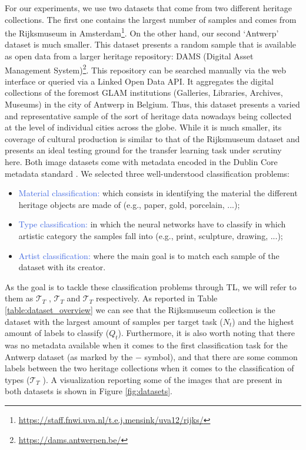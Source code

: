 For our experiments, we use two datasets that come from two different heritage collections. The first one contains the largest number of samples and comes from the Rijksmuseum in Amsterdam\footnote{\url{https://staff.fnwi.uva.nl/t.e.j.mensink/uva12/rijks/}}. On the other hand, our second `Antwerp' dataset is much smaller. This dataset presents a random sample that is available as open data from a larger heritage repository: DAMS (Digital Asset Management System)\footnote{\url{https://dams.antwerpen.be/}}. This repository can be searched manually via the web interface or queried via a Linked Open Data API. It aggregates the digital collections of the foremost GLAM institutions  (Galleries, Libraries, Archives, Museums) in the city of Antwerp in Belgium. Thus, this dataset presents a varied and representative sample of the sort of heritage data nowadays being collected at the level of individual cities across the globe. While it is much smaller, its coverage of cultural production is similar to that of the Rijksmuseum dataset and presents an ideal testing ground for the transfer learning task under scrutiny here. Both image datasets come with metadata encoded in the Dublin Core metadata standard \cite{weibel1998dublin}. We selected three well-understood classification problems:
\begin{itemize}
	\item \textcolor{RoyalBlue}{Material classification:} which consists in identifying the material the different heritage objects are made of (e.g., paper, gold, porcelain, ...); 
	\item \textcolor{RoyalBlue}{Type classification:} in which the neural networks have to classify in which artistic category the samples fall into (e.g., print, sculpture, drawing, ...);
	\item \textcolor{RoyalBlue}{Artist classification:} where the main goal is to match each sample of the dataset with its creator.
\end{itemize}

As the goal is to tackle these classification problems through TL, we will refer to them as $\mathcal{T}_T$ , $\mathcal{T}_T$  and $\mathcal{T}_T$  respectively. As reported in Table \ref{table:dataset_overview} we can see that the Rijksmuseum collection is the dataset with the largest amount of samples per target task ($N_t$) and the highest amount of labels to classify ($Q_t$). Furthermore, it is also worth noting that there was no metadata available when it comes to the first classification task for the Antwerp dataset (as marked by the $-$ symbol), and that there are some common labels between the two heritage collections when it comes to the classification of types ($\mathcal{T}_T$ ). A visualization reporting some of the images that are present in both datasets is shown in Figure \ref{fig:datasets}.


